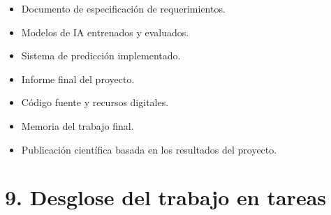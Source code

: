 \documentclass[
11pt, %
codirector, %
]{charter}
\begin{document}
\begin{itemize}
	\item Documento de especificación de requerimientos.
	\item Modelos de IA entrenados y evaluados.
	\item Sistema de predicción implementado.
	\item Informe final del proyecto.
	\item Código fuente y recursos digitales.
	\item Memoria del trabajo final.
	\item Publicación científica basada en los resultados del proyecto.
\end{itemize}

\section{9. Desglose del trabajo en tareas}
\label{sec
}
\end{document}

